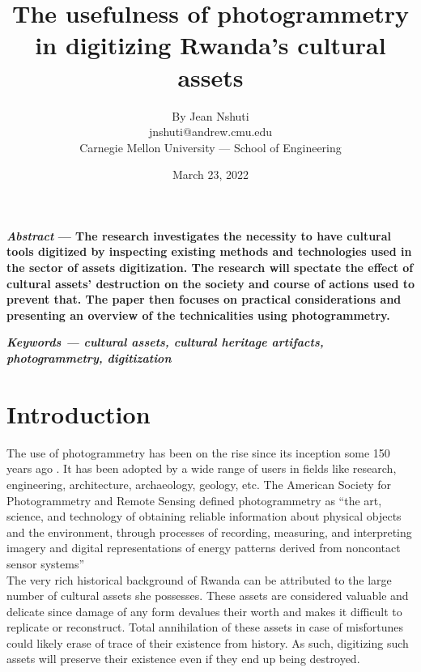 \documentclass[conference]{IEEEtran}
\begin{document}
\title{\Large{\textbf{The usefulness of photogrammetry in digitizing Rwanda's cultural assets}}}
\author{By Jean Nshuti \\ jnshuti@andrew.cmu.edu \\ Carnegie Mellon University — School of Engineering}
\date{March 23, 2022}
\maketitle

\textbf{\textit{Abstract} — The research investigates the necessity to have cultural tools digitized by inspecting existing methods
    and technologies used in the sector of assets digitization. The research will spectate the effect of cultural assets' destruction on the society
    and course of actions used to prevent that. The paper then focuses on practical considerations and presenting an overview of the technicalities using photogrammetry. \\}

\textbf{\textit{Keywords — cultural assets, cultural heritage artifacts, photogrammetry, digitization}}

\section{\textbf{Introduction}}
The use of photogrammetry has been on the rise since its inception some 150 years ago \cite{histphtgm}. It has been adopted by a wide range of users in fields
like research, engineering, architecture, archaeology, geology, etc.
The  American Society for Photogrammetry and Remote Sensing defined photogrammetry as \cite{Ebert2015} “the art, science, and technology
of obtaining reliable information about physical objects and the environment, through processes of recording, measuring,
and interpreting imagery and digital representations of energy patterns derived from noncontact sensor systems” \\

The very rich historical background of Rwanda can be attributed to the large number of cultural assets she possesses. These assets are considered valuable and
delicate since damage of any form devalues their worth and makes it difficult to replicate or reconstruct. Total annihilation of these assets in case of misfortunes
could likely erase of trace of their existence from history. As such, digitizing such assets will preserve their existence even if they end up being destroyed. \\
\end{document}
